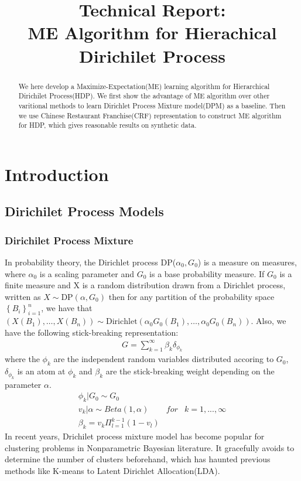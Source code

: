\documentclass{article}
\title{Technical Report:\\ME Algorithm for Hierachical Dirichilet Process}
\author{}
\begin{document}
\makeanontitle

\begin{abstract}We here develop a Maximize-Expectation(ME) learning algorithm for Hierarchical Dirichilet Process(HDP).
We first show the advantage of ME algorithm over other varitional methods to learn Dirichlet Process Mixture model(DPM) as a baseline. 
Then we use Chinese Restaurant Franchise(CRF) representation to construct ME algorithm for HDP, which 
gives reasonable results on synthetic data. 

\end{abstract}

\section{Introduction}
\subsection{Dirichilet Process Models}
\subsubsection{Dirichilet Process Mixture}
In probability theory, the Dirichlet process DP($\alpha_{0},G_{0}$) is a measure on measures, where $\alpha_{0}$ is a scaling
parameter and $G_{0}$ is a base probability measure. 
If $G_{0}$ is a finite measure and X is a random distribution drawn from a Dirichlet process, written as $X \sim \mathrm{DP}\left(\alpha,G_{0}\right)$
then for any partition of the probability space $\left\{B_i\right\}_{i=1}^{n}$, we have that
$\left(X\left(B_1\right),\dots,X\left(B_n\right)\right) \sim \mathrm{Dirichlet}\left(\alpha_{0}G_{0}\left(B_1\right),\dots,\alpha_{0}G_{0}\left(B_n\right)\right)$.
Also, we have the following stick-breaking representation:
\begin{eqnarray*}
 G=\sum_{k=1}^{\infty} \beta_{k}\delta_{\phi_{k}}
\end{eqnarray*}
where the $\phi_{k}$ are the independent random variables distributed accoring to $G_{0}$,
$\delta_{\phi_{k}}$ is an atom at $\phi_{k}$
and $\beta_{k}$ are the stick-breaking weight depending on the parameter $\alpha$.\\
\begin{eqnarray*}
\phi_{k}|G_{0}\sim G_{0}\\
v_{k}|\alpha \sim Beta(1,\alpha)  & for & k = 1,...,\infty\\
\beta_{k}=v_{k}\Pi_{l=1}^{k-1}(1-v_{l})
\end{eqnarray*}
In recent years, Drichilet process mixture model has become popular for clustering problems in Nonparametric Bayesian literature. 
It gracefully avoids to determine the number of clusters beforehand, which has haunted previous methods like K-means to Latent Dirichlet Allocation(LDA).
\end{document}
